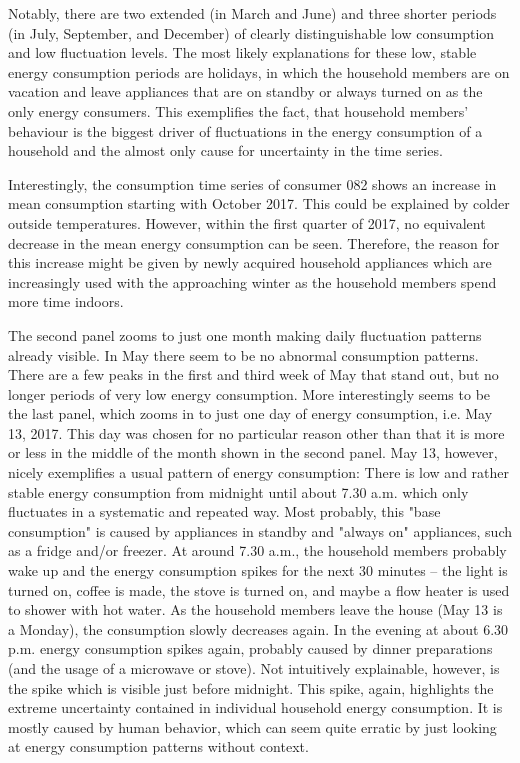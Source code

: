 Notably, there are two extended (in March and June) and three shorter periods (in July, September, and December) of clearly distinguishable low consumption and low fluctuation levels. The most likely explanations for these low, stable energy consumption periods are holidays, in which the household members are on vacation and leave appliances that are on standby or always turned on as the only energy consumers. This exemplifies the fact, that household members' behaviour is the biggest driver of fluctuations in the energy consumption of a household and the almost only cause for uncertainty in the time series.

Interestingly, the consumption time series of consumer 082 shows an increase in mean consumption starting with October 2017. This could be explained by colder outside temperatures. However, within the first quarter of 2017, no equivalent decrease in the mean energy consumption can be seen. Therefore, the reason for this increase might be given by newly acquired household appliances which are increasingly used with the approaching winter as the household members spend more time indoors.

The second panel zooms to just one month making daily fluctuation patterns already visible. In May there seem to be no abnormal consumption patterns. There are a few peaks in the first and third week of May that stand out, but no longer periods of very low energy consumption. More interestingly seems to be the last panel, which zooms in to just one day of energy consumption, i.e. May 13, 2017. This day was chosen for no particular reason other than that it is more or less in the middle of the month shown in the second panel. May 13, however, nicely exemplifies a usual pattern of energy consumption: There is low and rather stable energy consumption from midnight until about 7.30 a.m. which only fluctuates in a systematic and repeated way. Most probably, this "base consumption" is caused by appliances in standby and "always on" appliances, such as a fridge and/or freezer. At around 7.30 a.m., the household members probably wake up and the energy consumption spikes for the next 30 minutes -- the light is turned on, coffee is made, the stove is turned on, and maybe a flow heater is used to shower with hot water. As the household members leave the house (May 13 is a Monday), the consumption slowly decreases again. In the evening at about 6.30 p.m. energy consumption spikes again, probably caused by dinner preparations (and the usage of a microwave or stove). Not intuitively explainable, however, is the spike which is visible just before midnight. This spike, again, highlights the extreme uncertainty contained in individual household energy consumption. It is mostly caused by human behavior, which can seem quite erratic by just looking at energy consumption patterns without context.

